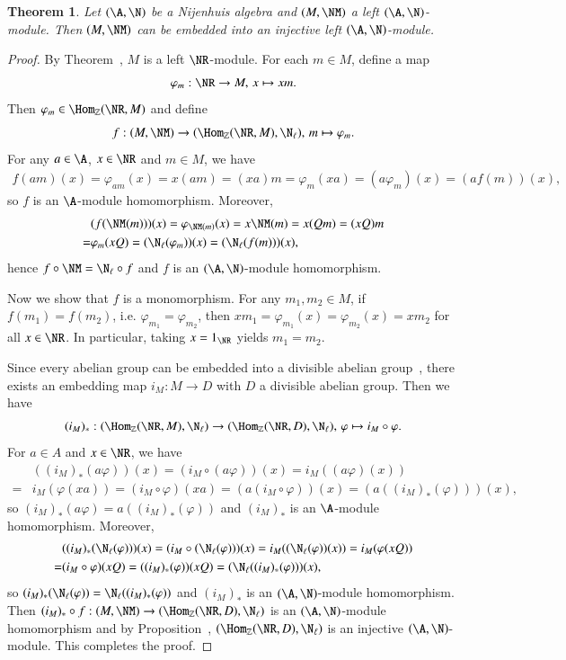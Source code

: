 \documentclass[12pt]{amsart}
\newtheorem{theorem}{Theorem}[section]
\theoremstyle{definition}
\begin{document}
\begin{theorem}
Let $(\A,\N)$ be a Nijenhuis algebra and $(M,\NM)$ a left $(\A,\N)$-module. Then $(M,\NM)$ can be embedded into an injective left $(\A,\N)$-module.
\end{theorem}

\begin{proof}
By Theorem~, $M$ is a left $\NR$-module. For each $m \in M$, define a map 
\[
\varphi_m: \NR \rightarrow M, \, x \mapsto xm. 
\]
Then $\varphi_m \in \Hom_{\mathbb{Z}}(\NR, M)$ and define 
\[
f: (M,\NM) \rightarrow (\Hom_{\mathbb{Z}}(\NR, M), \N_{\ell}), \, m \mapsto \varphi_m.
\]
For any $a \in \A$, $x\in \NR$ and $m\in M$, we have
\begin{align*}
f(am)(x)= \varphi_{am}(x)=x(am)=(xa)m=\varphi_{m}(xa)=(a\varphi_{m})(x)=(af(m))(x),
\end{align*}
so $f$ is an $\A$-module homomorphism. Moreover,
\begin{align*}
& (f(\NM(m)))(x)=\varphi_{\NM(m)}(x)=x \NM(m)=x(Qm)=(xQ)m\\
=& \varphi_{m}(xQ)=(\N_{\ell}(\varphi_m))(x)=(\N_{\ell}(f(m)))(x),
\end{align*}
hence $f \circ \NM=\N_{\ell} \circ f$ and $f$ is an $(\A,\N)$-module homomorphism. 

Now we show that $f$ is a monomorphism. For any $m_1, m_2\in M$, if $f(m_1)=f(m_2)$, i.e. $\varphi_{m_1}=\varphi_{m_2}$, then $xm_1=\varphi_{m_1}(x)=\varphi_{m_2}(x)=xm_2$ for all $x\in \NR$. In particular, taking $x =1_{\NR}$ yields $m_1=m_2$.

Since every abelian group can be embedded into a divisible abelian group~, there exists an embedding map $i_M: M \rightarrow D$ with $D$ a divisible abelian group.
Then we have 
\[(i_M)_{\ast}: (\Hom_{\mathbb{Z}}(\NR,M), \N_{\ell}) \rightarrow (\Hom_{\mathbb{Z}}(\NR,D), \N_{\ell}), \, \varphi \mapsto i_M \circ \varphi.
\]
For $a \in A$ and $x \in \NR$, we have 
\begin{align*}
& ((i_M)_{\ast}(a \varphi))(x)=(i_M \circ (a \varphi))(x)=i_M((a\varphi)(x))\\
=& i_M(\varphi(xa))=(i_M \circ \varphi)(xa)=(a(i_M \circ \varphi))(x)=(a((i_M)_{\ast}(\varphi)))(x),
\end{align*}
so $(i_M)_{\ast}(a \varphi)=a((i_M)_{\ast}(\varphi))$ and $(i_M)_{\ast}$ is an $\A$-module homomorphism. Moreover,
\begin{align*}
& ((i_M)_{\ast}(\N_{\ell}(\varphi)))(x)=(i_M \circ (\N_{\ell}(\varphi)))(x)=i_M((\N_{\ell}(\varphi))(x))=i_M(\varphi(xQ))\\
=& (i_M \circ \varphi)(xQ)=((i_M)_{\ast}(\varphi))(xQ)=(\N_{\ell}((i_M)_{\ast}(\varphi)))(x),
\end{align*}
so $(i_M)_{\ast}(\N_{\ell}(\varphi))=\N_{\ell}((i_M)_{\ast}(\varphi))$ and $(i_M)_{\ast}$ is an $(\A,\N)$-module homomorphism. Then $(i_M)_{\ast} \circ f: (M, \NM) \rightarrow (\Hom_{\mathbb{Z}}(\NR,D), \N_{\ell})$ is an $(\A,\N)$-module homomorphism and by Proposition~, $(\Hom_{\mathbb{Z}}(\NR,D), \N_{\ell})$ is an injective $(\A,\N)$-module. This completes the proof.
\end{proof}
\end{document}
